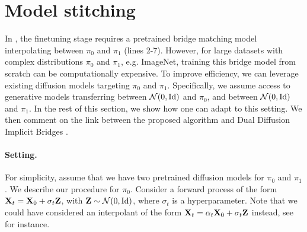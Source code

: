 \documentclass{article}
\begin{document}
\section{Model stitching}
\label{sec:model_stitching}

In , the finetuning stage requires a pretrained bridge matching model interpolating between $\pi_0$ and $\pi_1$ (lines 2-7). However, for large datasets with complex distributions $\pi_0$ and $\pi_1$, e.g. ImageNet, training this bridge model from scratch can be computationally expensive. To improve efficiency, we can leverage existing diffusion models targeting $\pi_0$ and $\pi_1$. Specifically, we assume access to generative models transferring between $\mathcal{N}(0, \mathrm{Id})$ and $\pi_0$, and between $\mathcal{N}(0, \mathrm{Id})$ and $\pi_1$. In the rest of this section, we show how one can adapt  to this setting. We then comment on the link between the proposed algorithm and Dual Diffusion Implicit Bridges \citep{su2022dual}. 

\paragraph{Setting.} For simplicity, assume that we have two pretrained diffusion models for $\pi_0$ and $\pi_1$. We describe our procedure for $\pi_0$. Consider a forward process of the form $\mathbf{X}_t = \mathbf{X}_0 + \sigma_t \mathbf{Z}$, with $\mathbf{Z} \sim \mathcal{N}(0, \mathrm{Id})$, where $\sigma_t$ is a hyperparameter. Note that we could have considered an interpolant of the form $\mathbf{X}_t = \alpha_t \mathbf{X}_0 + \sigma_t \mathbf{Z}$ instead, see \cite{song_denoising_2021} for instance. 
\end{document}
